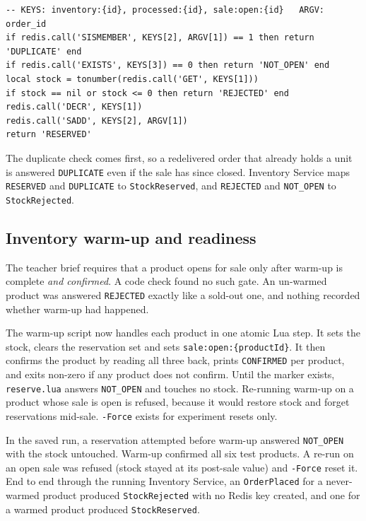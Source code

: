 \documentclass[a4paper]{report}
\begin{document}
\begin{Verbatim}[breaklines=true,breakanywhere=true,fontsize=\footnotesize]
-- KEYS: inventory:{id}, processed:{id}, sale:open:{id}   ARGV: order_id
if redis.call('SISMEMBER', KEYS[2], ARGV[1]) == 1 then return 'DUPLICATE' end
if redis.call('EXISTS', KEYS[3]) == 0 then return 'NOT_OPEN' end
local stock = tonumber(redis.call('GET', KEYS[1]))
if stock == nil or stock <= 0 then return 'REJECTED' end
redis.call('DECR', KEYS[1])
redis.call('SADD', KEYS[2], ARGV[1])
return 'RESERVED'
\end{Verbatim}

The duplicate check comes first, so a redelivered order that already holds a
unit is answered \texttt{DUPLICATE} even if the sale has since closed.
Inventory Service maps \texttt{RESERVED} and \texttt{DUPLICATE} to
\texttt{StockReserved}, and \texttt{REJECTED} and \texttt{NOT\_OPEN} to
\texttt{StockRejected}.

\subsection{Inventory warm-up and readiness}

The teacher brief requires that a product opens for sale only after warm-up
is complete \emph{and confirmed}. A code check found no such gate.
An un-warmed product was answered \texttt{REJECTED} exactly like a sold-out one,
and nothing recorded whether warm-up had happened.

The warm-up script now handles each product in one atomic Lua step.
It sets the stock, clears the reservation set and sets
\texttt{sale:open:\{productId\}}. It then confirms the product by reading all
three back, prints \texttt{CONFIRMED} per product, and exits non-zero if any
product does not confirm. Until the marker exists, \texttt{reserve.lua}
answers \texttt{NOT\_OPEN} and touches no stock. Re-running warm-up on a product
whose sale is open is refused, because it would restore stock and forget
reservations mid-sale. \texttt{-Force} exists for experiment resets only.

In the saved run, a reservation attempted before warm-up answered
\texttt{NOT\_OPEN} with the stock untouched. Warm-up confirmed all six test
products. A re-run on an open sale was refused (stock stayed at its
post-sale value) and \texttt{-Force} reset it. End to end through the running
Inventory Service, an \texttt{OrderPlaced} for a never-warmed product produced
\texttt{StockRejected} with no Redis key created, and one for a warmed product
produced \texttt{StockReserved}.
\end{document}

